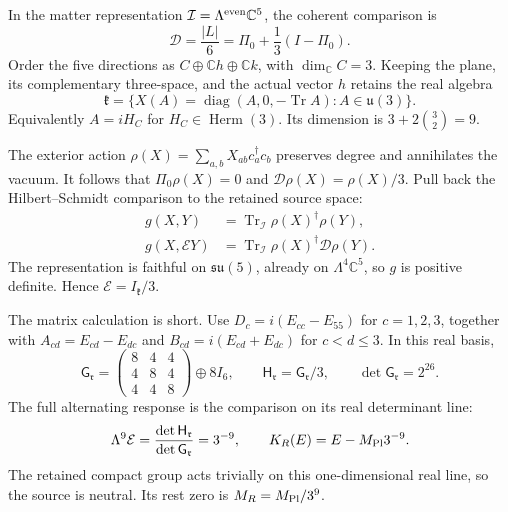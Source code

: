 \documentclass[aps,prx,reprint,longbibliography]{revtex4-2}
\providecommand{\Tr}{\operatorname{Tr}}
\providecommand{\diag}{\operatorname{diag}}
\providecommand{\Mpl}{M_{\rm Pl}}
\providecommand{\Herm}{\operatorname{Herm}}
\providecommand{\C}{\mathbb C}
\begin{document}
In the matter representation $\mathcal I=\Lambda^{\rm even}\C^5$, the coherent comparison is
\begin{equation}
 \mathcal D=\frac{|L|}{6}=\Pi_0+\frac13(I-\Pi_0).
 \label{ap:coherent-comparison}
\end{equation}
Order the five directions as $C\oplus\C h\oplus\C k$, with $\dim_\C C=3$. Keeping the plane, its complementary three-space, and the actual vector $h$ retains the real algebra
\begin{equation}
 \mathfrak k=\{X(A)=\diag(A,0,-\Tr A):A\in\mathfrak u(3)\}.
 \label{ap:retained-algebra}
\end{equation}
Equivalently $A=iH_C$ for $H_C\in\Herm(3)$. Its dimension is $3+2\binom32=9$.

The exterior action $\rho(X)=\sum_{a,b}X_{ab}c_a^\dagger c_b$ preserves degree and annihilates the vacuum. It follows that $\Pi_0\rho(X)=0$ and $\mathcal D\rho(X)=\rho(X)/3$. Pull back the Hilbert--Schmidt comparison to the retained source space:
\begin{equation}
 \begin{aligned}
 g(X,Y)&=\Tr_{\mathcal I}\rho(X)^\dagger\rho(Y),\\
 g(X,\mathcal EY)&=\Tr_{\mathcal I}\rho(X)^\dagger\mathcal D\rho(Y).
 \end{aligned}
 \label{ap:retained-pullback}
\end{equation}
The representation is faithful on $\mathfrak{su}(5)$, already on $\Lambda^4\C^5$, so $g$ is positive definite. Hence $\mathcal E=I_{\mathfrak k}/3$.

The matrix calculation is short. Use $D_c=i(E_{cc}-E_{55})$ for $c=1,2,3$, together with $A_{cd}=E_{cd}-E_{dc}$ and $B_{cd}=i(E_{cd}+E_{dc})$ for $c<d\leq3$. In this real basis,
\begin{equation}
 \mathsf G_{\mathfrak r}=\begin{pmatrix}8&4&4\\4&8&4\\4&4&8\end{pmatrix}\oplus8I_6,
 \qquad\mathsf H_{\mathfrak r}=\mathsf G_{\mathfrak r}/3,\qquad\det\mathsf G_{\mathfrak r}=2^{26}.
 \label{ap:nine-gram}
\end{equation}
The full alternating response is the comparison on its real determinant line:
\begin{equation}
 \Lambda^9\mathcal E=\frac{\det\mathsf H_{\mathfrak r}}{\det\mathsf G_{\mathfrak r}}=3^{-9},\qquad
 K_R(E)=E-\Mpl3^{-9}.
 \label{ap:nine-determinant}
\end{equation}
The retained compact group acts trivially on this one-dimensional real line, so the source is neutral. Its rest zero is $M_R=\Mpl/3^9$.
\end{document}
